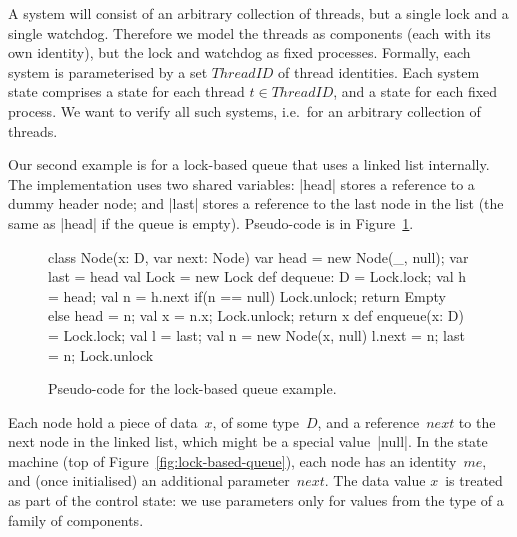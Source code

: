 A system will consist of an arbitrary collection of threads, but a single lock
and a single watchdog.  Therefore we model the threads as components (each
with its own identity), but the lock and watchdog as fixed processes.
Formally, each system is parameterised by a set $ThreadID$ of thread
identities.  Each system state comprises a state for each thread $t \in
ThreadID$, and a state for each fixed process.  We want to verify all such
systems, i.e.~for an arbitrary collection of threads.


Our second example is for a lock-based queue that uses a linked list
internally.  The implementation uses two shared variables: |head| stores a
reference to a dummy header node; and |last| stores a reference to the last
node in the list (the same as |head| if the queue is empty).
Pseudo-code is in Figure~\ref{fig:lock-based-queue-pseudocode}.


\begin{figure}[htb]
\begin{scala}
class Node(x: D, var next: Node)
var head = new Node(_, null); var last = head
val Lock = new Lock
def dequeue: D = {
  Lock.lock; val h = head; val n = h.next
  if(n == null){ Lock.unlock; return Empty }
  else{ head = n; val x = n.x; Lock.unlock; return x }
}
def enqueue(x: D) = {
  Lock.lock; val l = last; val n = new Node(x, null) 
  l.next = n; last = n; Lock.unlock
}
\end{scala}
\caption{Pseudo-code for the lock-based queue example.}
\label{fig:lock-based-queue-pseudocode}
\end{figure}


Each node hold a piece of data~$x$, of some type~$D$, and a reference~$next$
to the next node in the linked list, which might be a special value~|null|.
In the state machine (top of Figure~\ref{fig:lock-based-queue}), each node has
an identity~$me$, and (once initialised) an additional parameter~$next$.  The
data value $x$~is treated as part of the control state: we use parameters only
for values from the type of a family of components.



